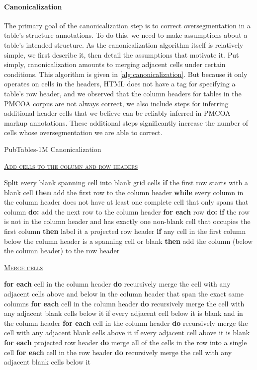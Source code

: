 \documentclass[10pt,twocolumn,letterpaper]{article}
\makeatletter
\newcommand{\HEADER}[1]{\ALC@it\underline{\textsc{#1}}\begin{ALC@g}}
\newcommand{\ENDHEADER}{\end{ALC@g}}
\makeatother
\begin{document}
\paragraph{Canonicalization}\label{par:canonicalization}
The primary goal of the canonicalization step is to correct oversegmentation in a table's structure annotations.
To do this, we need to make assumptions about a table's intended structure.
As the canonicalization algorithm itself is relatively simple, we first describe it, then detail the assumptions that motivate it.
Put simply, canonicalization amounts to merging adjacent cells under certain conditions.
This algorithm is given in \cref{alg:canonicalization}.
But because it only operates on cells in the headers, HTML does not have a tag for specifying a table's row header, and we observed that the column headers for tables in the PMCOA corpus are not always correct, we also include steps for inferring additional header cells that we believe can be reliably inferred in PMCOA markup annotations.
These additional steps significantly increase the number of cells whose oversegmentation we are able to correct.

\begin{algorithm}
  \caption{PubTables-1M Canonicalization}
  \label{alg:canonicalization}
  \small
  \begin{algorithmic}[1]
    \HEADER{Add cells to the column and row headers}
		\STATE Split every blank spanning cell into blank grid cells \label{algline:splitblank}
		\STATE \textbf{if} the first row starts with a blank cell \textbf{then} add the first row to the column header
			\STATE \textbf{while} every column in the column header does not have at least one complete cell that only spans that column \textbf{do:} add the next row to the column header
		\ENDIF
		\STATE \textbf{for each} row \textbf{do:} \textbf{if} the row is not in the column header and has exactly one non-blank cell that occupies the first column \textbf{then} label it a projected row header \label{algline:prh}
		\STATE \textbf{if} any cell in the first column below the column header is a spanning cell or blank \textbf{then} add the column (below the column header) to the row header
    \ENDHEADER
    \HEADER{Merge cells}
		\STATE \textbf{for each} cell in the column header \textbf{do} recursively merge the cell with any adjacent cells above and below in the column header that span the exact same columns \label{algline:mergecolumn}	
		\STATE \textbf{for each} cell in the column header \textbf{do} recursively merge the cell with any adjacent blank cells below it if every adjacent cell below it is blank and in the column header \label{algline:mergedown}
		\STATE \textbf{for each} cell in the column header \textbf{do} recursively merge the cell with any adjacent blank cells above it if every adjacent cell above it is blank
		\STATE \textbf{for each} projected row header \textbf{do} merge all of the cells in the row into a single cell
		\STATE \textbf{for each} cell in the row header \textbf{do} recursively merge the cell with any adjacent blank cells below it \label{algline: rowheadermerging}
    \ENDHEADER
\end{algorithmic}
\end{algorithm}
\end{document}
